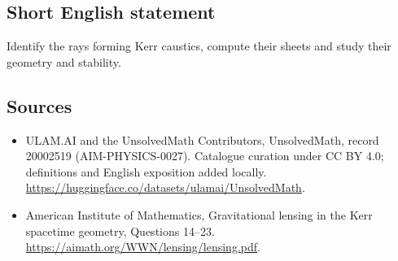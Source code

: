 \documentclass[11pt]{article}
\begin{document}
\subsection{Short English statement}
Identify the rays forming Kerr caustics, compute their sheets and study their geometry and stability.
\subsection{Sources}
\begin{itemize}
\item[\hypertarget{source:20002519:1}{S1}] ULAM.AI and the UnsolvedMath Contributors, UnsolvedMath, record 20002519 (AIM-PHYSICS-0027). Catalogue curation under CC BY 4.0; definitions and English exposition added locally.
\url{https://huggingface.co/datasets/ulamai/UnsolvedMath}.
\item[\hypertarget{source:20002519:2}{S2}] American Institute of Mathematics, Gravitational lensing in the Kerr spacetime geometry, Questions 14–23.
\url{https://aimath.org/WWN/lensing/lensing.pdf}.
\end{itemize}
\label{end:20002519}
\end{document}
